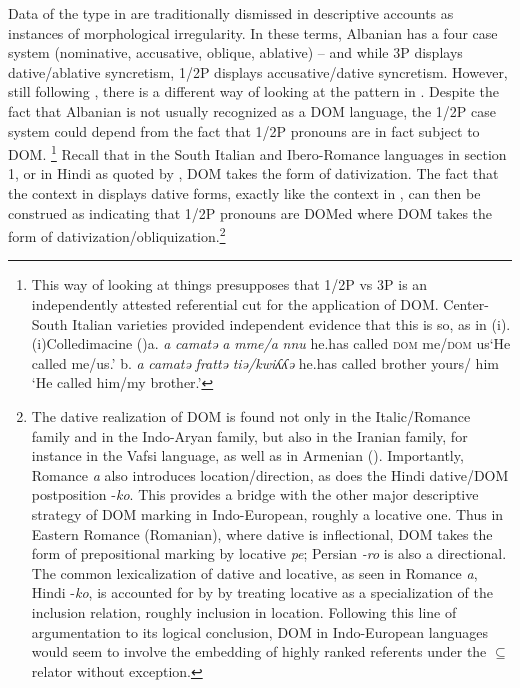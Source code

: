 \documentclass[output=paper]{langscibook}
\begin{document}
Data of the type in  are traditionally dismissed in descriptive accounts as instances of morphological irregularity. In these terms, Albanian has a four case system (nominative, accusative, oblique, ablative) – and while 3P displays dative/ablative syncretism, 1/2P displays accusative/dative syncretism. However, still following \citet{ManziniSavoia2014}, there is a different way of looking at the pattern in . Despite the fact that Albanian is not usually recognized as a DOM language, the 1/2P case system could depend from the fact that 1/2P pronouns are in fact subject to DOM.{} \footnote{This way of looking at things presupposes that 1/2P vs 3P is an independently attested referential cut for the application of DOM. Center-South Italian varieties provided independent evidence that this is so, as in (i).\textrm{(i)Colledimacine (\citealt{ManziniSavoia2005})}\textrm{a.} \textrm{\textit{a}   \textit{camatə} \textit{a} \textit{mme/a} \textit{nnu}} \textrm{he.has  called} \textrm{\textsc{dom}} \textrm{me/}\textrm{\textsc{dom}} \textrm{us}\textrm{‘He called me/us.’} \textrm{b.} \textrm{\textit{a}   \textit{camatə} \textit{frattə} \textit{tiə/kwiʎʎə}} \textrm{he.has  called   brother yours/ him} ‘He called him/my brother.’  } {}  Recall that in the South Italian and Ibero-Romance languages in section 1, or in Hindi as quoted by \citet{Torrego1998}, DOM takes the form of dativization. The fact that the context in  displays dative forms, exactly like the context in , can then be construed as indicating that 1/2P pronouns are DOMed where DOM takes the form of dativization/obliquization.\footnote{{ The dative realization of DOM is found not only in the Italic/Romance family and in the Indo-Aryan family, but also in the Iranian family, for instance in the Vafsi language, as well as in Armenian (\citealt{ManziniFranco2016}). Importantly, Romance \textit{a} also introduces location/direction, as does the Hindi dative/DOM postposition -\textit{ko}.} This provides a bridge with the other major descriptive strategy of DOM marking in Indo-European, roughly a locative one. Thus in Eastern Romance (Romanian), where dative is inflectional, DOM takes the form of prepositional marking by locative \textit{pe}; Persian \textit{{}-ro} is also a directional.  The common lexicalization of dative and locative, as seen in Romance \textit{a}, Hindi -\textit{ko}, is accounted for by \citet{FrancoManzini2017} by treating locative as a specialization of the inclusion relation, roughly inclusion in location. Following this line of argumentation to its logical conclusion, DOM in Indo-European languages would seem to involve the embedding of highly ranked referents under the \textrm{${\subseteq}$} relator without exception.}  
\end{document}
